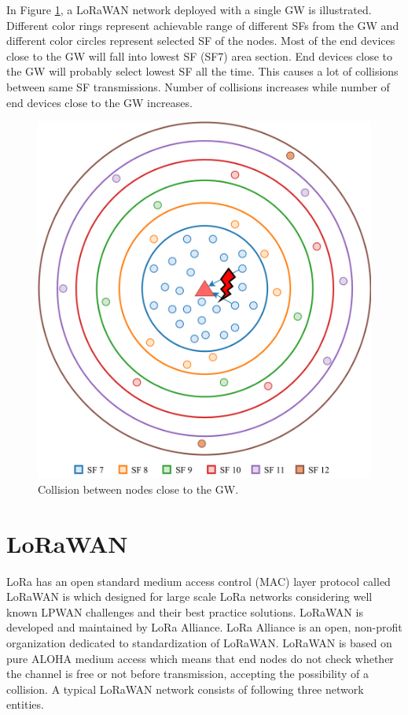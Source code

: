 \documentclass[conference]{IEEEtran}
\begin{document}
\par In Figure \ref{fig:collision}, a LoRaWAN network deployed with a single GW is illustrated. Different color rings represent achievable range of different SFs from the GW and different color circles represent selected SF of the nodes. Most of the end devices close to the GW will fall into lowest SF (SF7) area section. End devices close to the GW will probably select lowest SF all the time. This causes a lot of collisions between same SF transmissions. Number of collisions increases while number of end devices close to the GW increases.

\begin{figure}
\centering
\includegraphics[width=\linewidth]{collision}
\caption{Collision between nodes close to the GW.}
\label{fig:collision}
\end{figure}


\section{LoRaWAN} \label{LoRaWAN}
\par LoRa has an open standard medium access control (MAC) layer protocol called LoRaWAN is which designed for large scale LoRa networks considering well known LPWAN challenges and their best practice solutions. LoRaWAN is developed and maintained by LoRa Alliance. LoRa Alliance is an open, non-profit organization dedicated to standardization of LoRaWAN. LoRaWAN is based on pure ALOHA medium access which means that end nodes do not check whether the channel is free or not before transmission, accepting the possibility of a collision. A typical LoRaWAN network consists of following three network entities.
\end{document}
